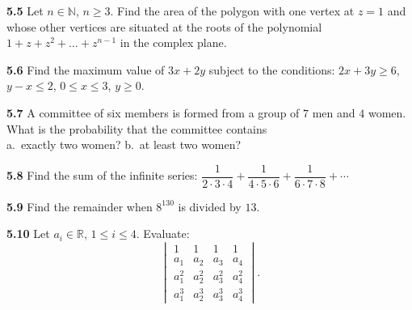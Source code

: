 \documentclass[11pt,a4paper]{article}
\newcommand{\N}{\mathbb{N}}
\newcommand{\R}{\mathbb{R}}
\newcommand{\qitem}[1]{\par\medskip\noindent\textbf{#1}\hspace{0.5em}}
\begin{document}
\qitem{5.5} Let $n \in \N$, $n \ge 3$. Find the area of the polygon with one vertex at $z = 1$ and whose other vertices are situated at the roots of the polynomial $1 + z + z^2 + \dots + z^{n-1}$ in the complex plane.

\qitem{5.6} Find the maximum value of $3x + 2y$ subject to the conditions: $2x + 3y \ge 6$, $y - x \le 2$, $0 \le x \le 3$, $y \ge 0$.

\qitem{5.7} A committee of six members is formed from a group of $7$ men and $4$ women. What is the probability that the committee contains\\
a.\ exactly two women? \qquad b.\ at least two women?

\qitem{5.8} Find the sum of the infinite series: $\dfrac{1}{2\cdot 3\cdot 4} + \dfrac{1}{4\cdot 5\cdot 6} + \dfrac{1}{6\cdot 7\cdot 8} + \cdots$

\qitem{5.9} Find the remainder when $8^{130}$ is divided by $13$.

\qitem{5.10} Let $a_i \in \R$, $1 \le i \le 4$. Evaluate:
\[
  \begin{vmatrix}
    1 & 1 & 1 & 1 \\
    a_1 & a_2 & a_3 & a_4 \\
    a_1^2 & a_2^2 & a_3^2 & a_4^2 \\
    a_1^3 & a_2^3 & a_3^3 & a_4^3
  \end{vmatrix}.
\]
\end{document}
